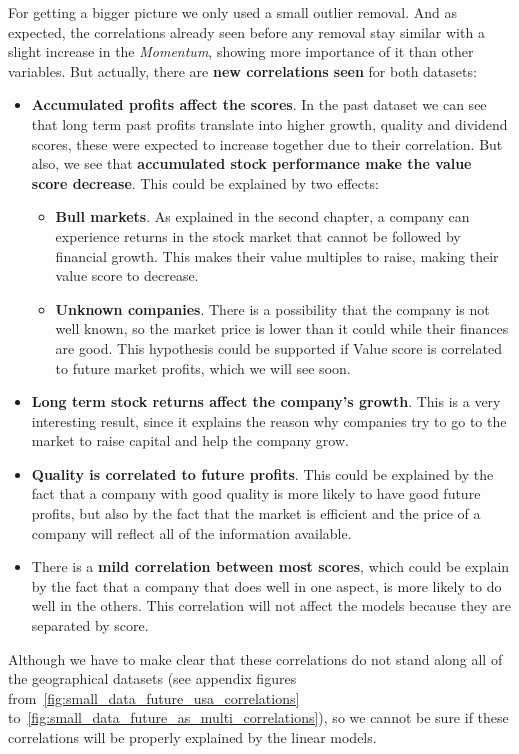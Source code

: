 \documentclass[11pt,english,a4paper,hidelinks]{book}
\begin{document}
\noindent For getting a bigger picture we only used a small outlier removal. And as expected, the correlations already seen before any removal stay similar with a slight increase in the \textit{Momentum}, showing more importance of it than other variables. But actually, there are \textbf{new correlations seen} for both datasets:

\begin{itemize}
    \item  \textbf{Accumulated profits affect the scores}. In the past dataset we can see that long term past profits translate into higher growth, quality and dividend scores, these were expected to increase together due to their correlation. But also, we see that \textbf{accumulated stock performance make the value score decrease}. This could be explained by two effects:
    \begin{itemize}
        \item \textbf{Bull markets}. As explained in the second chapter, a company can experience returns in the stock market that cannot be followed by financial growth. This makes their value multiples to raise, making their value score to decrease.
        \item \textbf{Unknown companies}. There is a possibility that the company is not well known, so the market price is lower than it could while their finances are good. This hypothesis could be supported if Value score is correlated to future market profits, which we will see soon.
    \end{itemize}
    \item \textbf{Long term stock returns affect the company's growth}. This is a very interesting result, since it explains the reason why companies try to go to the market to raise capital and help the company grow.
    \item \textbf{Quality is correlated to future profits}. This could be explained by the fact that a company with good quality is more likely to have good future profits, but also by the fact that the market is efficient and the price of a company will reflect all of the information available.
    \item There is a \textbf{mild correlation between most scores}, which could be explain by the fact that a company that does well in one aspect, is more likely to do well in the others. This correlation will not affect the models because they are separated by score.
\end{itemize}

\noindent Although we have to make clear that these correlations do not stand along all of the geographical datasets (see appendix figures from~\ref{fig:small_data_future_usa_correlations} to~\ref{fig:small_data_future_as_multi_correlations}), so we cannot be sure if these correlations will be properly explained by the linear models.
\end{document}
